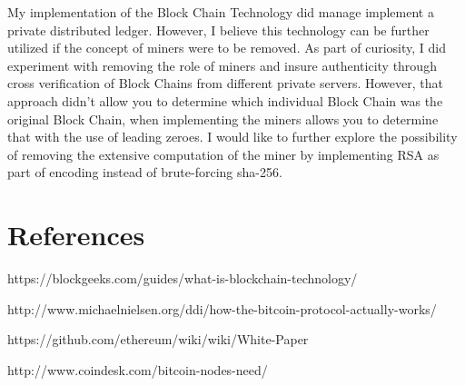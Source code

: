 \documentclass{article} %
\begin{document}
\begin{flushleft}
My implementation of the Block Chain Technology did manage implement a private distributed ledger. However, I believe this technology can be further utilized if the concept of miners were to be removed. As part of curiosity, I did experiment with removing the role of miners and insure authenticity through cross verification of Block Chains from different private servers. However, that approach didn't allow you to determine which individual Block Chain was the original Block Chain, when implementing the miners allows you to determine that with the use of leading zeroes. I would like to further explore the possibility of removing the extensive computation of the miner by implementing RSA as part of encoding instead of brute-forcing sha-256.

\noindent \eject 
\end{flushleft}

\noindent 
\section{References }

\noindent \begin{flushleft}
[1]https://blockgeeks.com/guides/what-is-blockchain-technology/

\noindent [2]http://www.michaelnielsen.org/ddi/how-the-bitcoin-protocol-actually-works/

\noindent [3]https://github.com/ethereum/wiki/wiki/White-Paper

\noindent [4]http://www.coindesk.com/bitcoin-nodes-need/
\end{flushleft}
\end{document}
